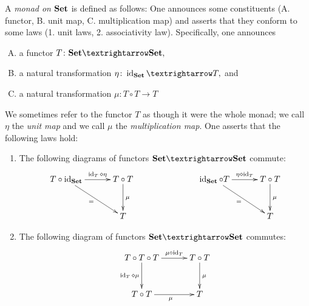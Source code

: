 \documentclass[../main/CT4S-EN-RU]{subfiles}
\begin{document}
\begin{blockRUS}
\end{blockRUS}

\begin{definitionENG}[Monad]\label{def:monad}
A {\em monad on ${\mathbf{Set}}$} is defined as follows: One announces some constituents (A. functor, B. unit map, C. multiplication map) and asserts that they conform to some laws (1. unit laws, 2. associativity law). Specifically, one announces
\begin{enumerate}[A.]
\item a functor $T\colon\Set{→}\Set,$
\item a natural transformation $\eta\colon\id_{\Set}{→} T,$ and 
\item a natural transformation $\mu\colon T\circ T{→} T$
\end{enumerate}
We sometimes refer to the functor $T$ as though it were the whole monad; we call $\eta$ the {\em unit map} and we call $\mu$ the {\em multiplication map}. One asserts that the following laws hold:
\begin{enumerate}[1.]
\item The following diagrams of functors $\Set{→}\Set$ commute:
\begin{align*}
\xymatrix@=30pt{T\circ\id_\Set\ar[r]^-{\id_T\diamond\eta}\ar[dr]_{=}&T\circ T\ar[d]^\mu\\&T}\hspace{1in}
\xymatrix@=30pt{\id_\Set\circ T\ar[r]^-{\eta\diamond\id_T}\ar[dr]_=&T\circ T\ar[d]^\mu\\&T}
\end{align*}
\item The following diagram of functors $\Set{→}\Set$ commutes:
\begin{align*}
\xymatrix@=30pt{T\circ T\circ T\ar[r]^-{\mu\diamond\id_T}\ar[d]_-{\id_T\diamond\mu}&T\circ T\ar[d]^\mu\\T\circ T\ar[r]_\mu&T}\end{align*}
\end{enumerate}
\end{definitionENG}

\begin{definitionRUS}[Monad]\label{def:monad}
\end{definitionRUS}
\end{document}
